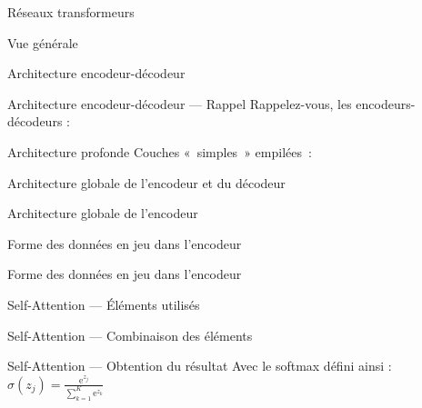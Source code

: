 \begin{frame}{Réseaux transformeurs}
\end{frame}

\begin{frame}{Vue générale}
\end{frame}

\begin{frame}{Architecture encodeur-décodeur}
\end{frame}

\begin{frame}{Architecture encodeur-décodeur --- Rappel}
  Rappelez-vous, les encodeurs-décodeurs :
\end{frame}

\begin{frame}{Architecture profonde}
  Couches «~simples~» empilées~:
\end{frame}

\begin{frame}{Architecture globale de l'encodeur et du décodeur}
\end{frame}

\begin{frame}{Architecture globale de l'encodeur}
\end{frame}

\begin{frame}{Forme des données en jeu dans l'encodeur}
\end{frame}

\begin{frame}{Forme des données en jeu dans l'encodeur}
\end{frame}

\begin{frame}{Self-Attention --- Éléments utilisés}
\end{frame}

\begin{frame}{Self-Attention --- Combinaison des éléments}
\end{frame}

\begin{frame}{Self-Attention --- Obtention du résultat}
  Avec le softmax défini ainsi : $\sigma(z_j)=\frac {\mathrm{e}^{z_j}}{\sum _{k=1}^{K}\mathrm{e}^{z_{k}}}$
\end{frame}

